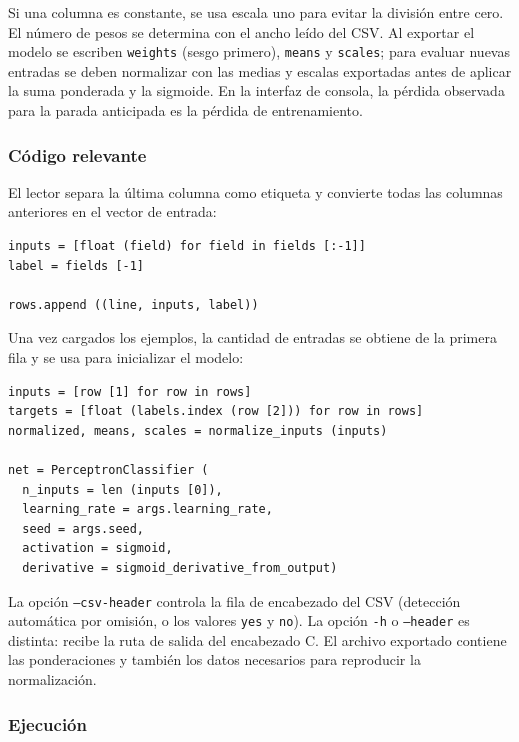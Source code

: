 \documentclass{article}[12pt,a4paper]
\begin{document}
Si una columna es constante, se usa escala uno para evitar la división entre
cero. El número de pesos se determina con el ancho leído del CSV. Al exportar
el modelo se escriben \texttt{weights} (sesgo primero),
\texttt{means} y \texttt{scales}; para evaluar nuevas entradas
se deben normalizar con las medias y escalas exportadas antes de aplicar la
suma ponderada y la sigmoide. En la interfaz de consola, la pérdida observada
para la parada anticipada es la pérdida de entrenamiento.

\subsubsection{Código relevante}

El lector separa la última columna como etiqueta y convierte todas las columnas
anteriores en el vector de entrada:

\begin{verbatim}
inputs = [float (field) for field in fields [:-1]]
label = fields [-1]

rows.append ((line, inputs, label))
\end{verbatim}

Una vez cargados los ejemplos, la cantidad de entradas se obtiene de la primera
fila y se usa para inicializar el modelo:

\begin{verbatim}
inputs = [row [1] for row in rows]
targets = [float (labels.index (row [2])) for row in rows]
normalized, means, scales = normalize_inputs (inputs)

net = PerceptronClassifier (
  n_inputs = len (inputs [0]),
  learning_rate = args.learning_rate,
  seed = args.seed,
  activation = sigmoid,
  derivative = sigmoid_derivative_from_output)
\end{verbatim}

La opción \texttt{--csv-header} controla la fila de encabezado del
CSV (detección automática por omisión, o los valores \texttt{yes} y
\texttt{no}). La opción \texttt{-h} o
\texttt{--header} es distinta: recibe la ruta de salida del encabezado
C. El archivo exportado contiene las ponderaciones y también los datos
necesarios para reproducir la normalización.

\subsubsection{Ejecución}
\end{document}
